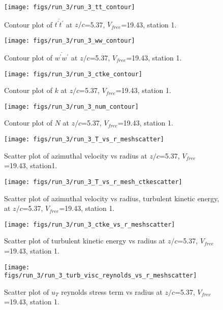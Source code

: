 \begin{figure}[H]
\centering
\texttt{[image: figs/run\_3/run\_3\_tt\_contour]}
\caption{Contour plot of $\overline{t^\prime t^\prime}$ at $z/c$=5.37, $V_{free}$=19.43, station 1.}
\end{figure}


\begin{figure}[H]
\centering
\texttt{[image: figs/run\_3/run\_3\_ww\_contour]}
\caption{Contour plot of $\overline{w^\prime w^\prime}$ at $z/c$=5.37, $V_{free}$=19.43, station 1.}
\end{figure}


\begin{figure}[H]
\centering
\texttt{[image: figs/run\_3/run\_3\_ctke\_contour]}
\caption{Contour plot of $k$ at $z/c$=5.37, $V_{free}$=19.43, station 1.}
\end{figure}


\begin{figure}[H]
\centering
\texttt{[image: figs/run\_3/run\_3\_num\_contour]}
\caption{Contour plot of $N$ at $z/c$=5.37, $V_{free}$=19.43, station 1.}
\end{figure}


\begin{figure}[H]
\centering
\texttt{[image: figs/run\_3/run\_3\_T\_vs\_r\_meshscatter]}
\caption{Scatter plot of azimuthal velocity vs radius at $z/c$=5.37, $V_{free}$=19.43, station1.}
\end{figure}


\begin{figure}[H]
\centering
\texttt{[image: figs/run\_3/run\_3\_T\_vs\_r\_mesh\_ctkescatter]}
\caption{Scatter plot of azimuthal velocity vs radius, turbulent kinetic energy, at $z/c$=5.37, $V_{free}$=19.43, station 1.}
\end{figure}


\begin{figure}[H]
\centering
\texttt{[image: figs/run\_3/run\_3\_ctke\_vs\_r\_meshscatter]}
\caption{Scatter plot of turbulent kinetic energy vs radius at $z/c$=5.37, $V_{free}$=19.43, station 1.}
\end{figure}


\begin{figure}[H]
\centering
\texttt{[image: figs/run\_3/run\_3\_turb\_visc\_reynolds\_vs\_r\_meshscatter]}
\caption{Scatter plot of $
u_T$ reynolds stress term vs radius at $z/c$=5.37, $V_{free}$=19.43, station 1.}
\end{figure}


